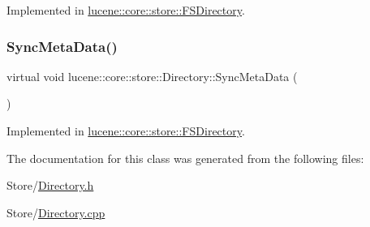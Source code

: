 Implemented in \mbox{\hyperlink{classlucene_1_1core_1_1store_1_1FSDirectory_a142dc145b0d1a4003c6a940a1da0f1e5}{lucene\+::core\+::store\+::\+F\+S\+Directory}}.

\mbox{\label{classlucene_1_1core_1_1store_1_1Directory_aa5ad7f9b517071b37c7d10858480f26d}} 
\subsubsection{\texorpdfstring{Sync\+Meta\+Data()}{SyncMetaData()}}
{\footnotesize\ttfamily virtual void lucene\+::core\+::store\+::\+Directory\+::\+Sync\+Meta\+Data (\begin{DoxyParamCaption}{ }\end{DoxyParamCaption})\hspace{0.3cm}{\ttfamily [pure virtual]}}



Implemented in \mbox{\hyperlink{classlucene_1_1core_1_1store_1_1FSDirectory_a3427605a8d3b36c51f623896f73e525c}{lucene\+::core\+::store\+::\+F\+S\+Directory}}.



The documentation for this class was generated from the following files\+:\begin{DoxyCompactItemize}
\item 
Store/\mbox{\hyperlink{Directory_8h}{Directory.\+h}}\item 
Store/\mbox{\hyperlink{Directory_8cpp}{Directory.\+cpp}}\end{DoxyCompactItemize}
